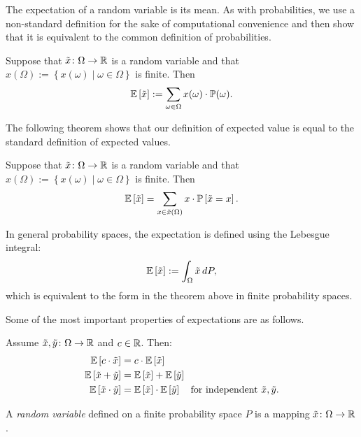 The expectation of a random variable is its mean. As with probabilities, we use a non-standard definition for the sake of computational convenience and then show that it is equivalent to the common definition of probabilities. 
\begin{definition} \label{def:expectation}
Suppose that $\tilde{x}\colon \Omega \to \mathbb{R} $ is a random variable and that $x(\Omega) := \left\{ x(\omega) \mid  \omega \in \Omega  \right\}$ is finite. Then
\[ 
 \mathbb{E}\left[\tilde{x}\right] := \sum_{\omega \in \Omega }  x(\omega) \cdot  \mathbb{P}(\omega).
\]
\end{definition}

The following theorem shows that our definition of expected value is equal to the standard definition of expected values. 
\begin{theorem} \label{def:expectation}
Suppose that $\tilde{x}\colon \Omega \to \mathbb{R} $ is a random variable and that $x(\Omega) := \left\{ x(\omega) \mid  \omega \in \Omega  \right\}$ is finite. Then
\[ 
 \mathbb{E}\left[\tilde{x}\right] = \sum_{x\in \tilde{x}(\Omega)}  x\cdot \mathbb{P}\left[\tilde{x} = x\right].
\]
\end{theorem}
In general probability spaces, the expectation is defined using the Lebesgue integral:
\[
 \mathbb{E}\left[\tilde{x}\right] := \int_{\Omega} \tilde{x} \, dP,
\]
which is equivalent to the form in the theorem above in finite probability spaces.  

Some of the most important properties of expectations are as follows.
\begin{theorem}
  Assume $\tilde{x},\tilde{y}\colon \Omega \to \mathbb{R}$ and $c\in \mathbb{R} $. Then:
  \begin{align*}
    \mathbb{E}\left[c\cdot \tilde{x}\right] &= c \cdot  \mathbb{E}\left[\tilde{x}\right]\\
    \mathbb{E}\left[\tilde{x} + \tilde{y}\right] &= \mathbb{E}\left[\tilde{x}\right] + \mathbb{E}\left[\tilde{y}\right]\\
    \mathbb{E}\left[\tilde{x} \cdot \tilde{y}\right] &= \mathbb{E}\left[\tilde{x}\right] \cdot \mathbb{E}\left[\tilde{y}\right] \quad \text{for independent } \tilde{x}, \tilde{y}.
  \end{align*}
\end{theorem}

\begin{definition}
A \emph{random variable} defined on a finite probability space $P$ is a mapping $\tilde{x}\colon \Omega \to \mathbb{R}$.
\end{definition}

